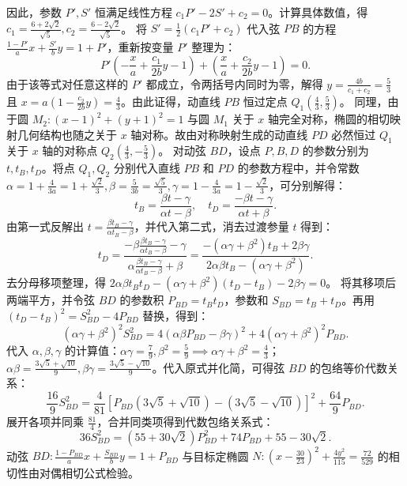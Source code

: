 \begin{solution}
因此，参数 $P', S'$ 恒满足线性方程 $c_1 P' - 2 S' + c_2 = 0$。计算具体数值，得 $c_1 = \frac{6+2\sqrt{2}}{\sqrt{5}}, c_2 = \frac{6-2\sqrt{2}}{\sqrt{5}}$。
将 $S' = \frac{1}{2}(c_1 P' + c_2)$ 代入弦 $PB$ 的方程 $\frac{1-P'}{a}x + \frac{S'}{b}y = 1+P'$，重新按变量 $P'$ 整理为：
\[ P' \left( -\frac{x}{a} + \frac{c_1}{2b}y - 1 \right) + \left( \frac{x}{a} + \frac{c_2}{2b}y - 1 \right) = 0. \]
由于该等式对任意这样的 $P'$ 都成立，令两括号内同时为零，解得 $y = \frac{4b}{c_1+c_2} = \frac{5}{3}$ 且 $x = a\left( 1 - \frac{c_2}{2b}y \right) = \frac{4}{3}$。由此证得，动直线 $PB$ 恒过定点 $Q_1\left(\frac{4}{3}, \frac{5}{3}\right)$。
同理，由于圆 $M_2: (x-1)^2 + (y+1)^2 = 1$ 与圆 $M_1$ 关于 $x$ 轴完全对称，椭圆的相切映射几何结构也随之关于 $x$ 轴对称。故由对称映射生成的动直线 $PD$ 必然恒过 $Q_1$ 关于 $x$ 轴的对称点 $Q_2\left(\frac{4}{3}, -\frac{5}{3}\right)$。
对动弦 $BD$，设点 $P, B, D$ 的参数分别为 $t, t_B, t_D$。将点 $Q_1, Q_2$ 分别代入直线 $PB$ 和 $PD$ 的参数方程中，并令常数 $\alpha = 1+\frac{4}{3a} = 1+\frac{\sqrt{2}}{3}, \beta = \frac{5}{3b} = \frac{\sqrt{5}}{3}, \gamma = 1-\frac{4}{3a} = 1-\frac{\sqrt{2}}{3}$，可分别解得：
\[ t_B = \frac{\beta t - \gamma}{\alpha t - \beta}, \quad t_D = \frac{-\beta t - \gamma}{\alpha t + \beta}. \]
由第一式反解出 $t = \frac{\beta t_B - \gamma}{\alpha t_B - \beta}$，并代入第二式，消去过渡参量 $t$ 得到：
\[ t_D = \frac{-\beta \frac{\beta t_B - \gamma}{\alpha t_B - \beta} - \gamma}{\alpha \frac{\beta t_B - \gamma}{\alpha t_B - \beta} + \beta} = \frac{-(\alpha\gamma+\beta^2)t_B + 2\beta\gamma}{2\alpha\beta t_B - (\alpha\gamma+\beta^2)}. \]
去分母移项整理，得 $2\alpha\beta t_B t_D - (\alpha\gamma+\beta^2)(t_D - t_B) - 2\beta\gamma = 0$。
将其移项后两端平方，并令弦 $BD$ 的参数积 $P_{BD} = t_B t_D$，参数和 $S_{BD} = t_B + t_D$。再用 $(t_D - t_B)^2 = S_{BD}^2 - 4P_{BD}$ 替换，得到：
\[ (\alpha\gamma + \beta^2)^2 S_{BD}^2 = 4(\alpha\beta P_{BD} - \beta\gamma)^2 + 4(\alpha\gamma + \beta^2)^2 P_{BD}. \]
代入 $\alpha, \beta, \gamma$ 的计算值：$\alpha\gamma = \frac{7}{9}, \beta^2 = \frac{5}{9} \implies \alpha\gamma+\beta^2 = \frac{4}{3}$；$\alpha\beta = \frac{3\sqrt{5}+\sqrt{10}}{9}, \beta\gamma = \frac{3\sqrt{5}-\sqrt{10}}{9}$。代入原式并化简，可得弦 $BD$ 的包络等价代数关系：
\[ \frac{16}{9} S_{BD}^2 = \frac{4}{81} \left[ P_{BD}(3\sqrt{5}+\sqrt{10}) - (3\sqrt{5}-\sqrt{10}) \right]^2 + \frac{64}{9} P_{BD}. \]
展开各项并同乘 $\frac{81}{4}$，合并同类项得到代数包络关系式：
\[ 36 S_{BD}^2 = (55+30\sqrt{2}) P_{BD}^2 + 74 P_{BD} + 55-30\sqrt{2}. \]
动弦 $BD: \frac{1-P_{BD}}{a}x + \frac{S_{BD}}{b}y = 1+P_{BD}$ 与目标定椭圆 $N: \left(x - \frac{30}{23}\right)^2 + \frac{4y^2}{115} = \frac{72}{529}$ 的相切性由对偶相切公式检验。

\end{solution}
